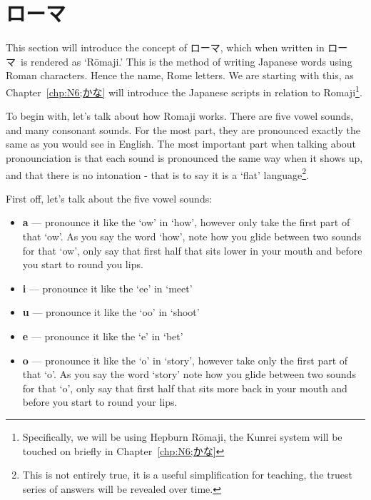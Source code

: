 \section[ローマ字]{ローマ}\label{sec:N6;発音;ローマ字}

This section will introduce the concept of ローマ, which when written in ローマ~is rendered as `R\=omaji.' This is the method of writing Japanese words using Roman characters. Hence the name, Rome letters. We are starting with this, as Chapter~\ref{chp:N6;かな} will introduce the Japanese scripts in relation to Romaji\footnote{Specifically, we will be using Hepburn R\=omaji, the Kunrei system will be touched on briefly in Chapter~\ref{chp:N6;かな}}.

To begin with, let's talk about how Romaji works. There are five vowel sounds, and many consonant sounds. For the most part, they are pronounced exactly the same as you would see in English. The most important part when talking about pronounciation is that each sound is pronounced the same way when it shows up, and that there is no intonation - that is to say it is a `flat' language\footnote{This is not entirely true, it is a useful simplification for teaching, the truest series of answers will be revealed over time.}.

First off, let's talk about the five vowel sounds:

\begin{itemize}

	\item \textbf{a} --- pronounce it like the `ow' in `how', however only take the first part of that `ow'. As you say the word `how', note how you glide between two sounds for that `ow', only say that first half that sits lower in your mouth and before you start to round you lips.

	\item \textbf{i} --- pronounce it like the `ee' in `meet'

	\item \textbf{u} --- pronounce it like the `oo' in `shoot'

	\item \textbf{e} --- pronounce it like the `e' in `bet'

	\item \textbf{o} --- pronounce it like the `o' in `story', however take only the first part of that `o'. As you say the word `story' note how you glide between two sounds for that `o', only say that first half that sits more back in your mouth and before you start to round your lips.

\end{itemize}

